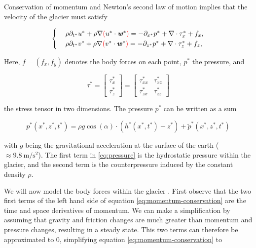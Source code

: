 Conservation of momentum and Newton's second law of motion implies that the velocity of the glacier must satisfy

\begin{equation} \label{eq:momentum-conservation}
  \begin{cases}
    &\rho \partial_{t^*} u^* + \rho \nabla \textcolor{red}{(}u^* \cdot \boldsymbol{\mathit{w}}^*\textcolor{red}{)} = -\partial_{x^*} p^* + \nabla \cdot \tau_x^* + f_x, \\
    &\rho \partial_{t^*} v^* + \rho \nabla \textcolor{red}{(} v^* \cdot \boldsymbol{\mathit{w}}^*\textcolor{red}{)} = -\partial_{z^*} p^* + \nabla \cdot \tau_z^* + f_z,
  \end{cases}
\end{equation}


Here, $f = (f_x, f_y)$ denotes the body forces on each point, $p^*$ the pressure, and

\begin{equation}
  \tau^* = \begin{bmatrix} \tau_x^* \\ \tau_z^* \end{bmatrix} = \begin{bmatrix} \tau_{xx}^* & \tau_{xz}^* \\ \tau_{zx}^* & \tau_{zz}^* \end{bmatrix}
\end{equation}

the stress tensor in two dimensions. The pressure $p^*$ can be written as a sum

\begin{equation} \label{eq:pressure}
  p^*(x^*, z^*, t^*) = \rho g \cos(\alpha) \cdot (h^*(x^*, t^*) - z^*) + \tilde{p}^*(x^*, z^*, t^*)
\end{equation}

with $g$ being the gravitational acceleration at the surface of the earth ($\approx \SI{9.8}{\meter\per\square\second}$). The first term in \eqref{eq:pressure} is the hydrostatic pressure within the glacier, and the second term is the counterpressure induced by the constant density $\rho$.

We will now model the body forces within the glacier . First observe that the two first terms of the left hand side of equation \eqref{eq:momentum-conservation} are the time and space derivatives of momentum.
We can make a simplification by assuming that gravity and friction changes are much greater than momentum and pressure changes, resulting in a steady state. This two terms can therefore be approximated to $0$, simplifying equation \eqref{eq:momentum-conservation} to 

